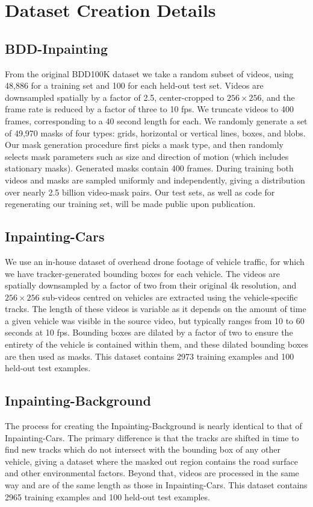 \chapter{Dataset Creation Details}
\label{app:datasetss}
\section{BDD-Inpainting}

From the original BDD100K dataset we take a random subset of videos, using 48,886 for a training set and 100 for each held-out test set. Videos are downsampled spatially by a factor of 2.5, center-cropped to $256 \times 256$, and the frame rate is reduced by a factor of three to 10 fps.  We truncate videos to 400 frames, corresponding to a 40 second length for each. We randomly generate a set of 49,970 masks of four types: grids, horizontal or vertical lines, boxes, and blobs. Our mask generation procedure first picks a mask type, and then randomly selects mask parameters such as size and direction of motion (which includes stationary masks). Generated masks contain 400 frames. During training both videos and masks are sampled uniformly and independently, giving a distribution over nearly 2.5 billion video-mask pairs. Our test sets, as well as code for regenerating our training set, will be made public upon publication.

\section{Inpainting-Cars}
 We use an in-house dataset of overhead drone footage of vehicle traffic, for which we have tracker-generated bounding boxes for each vehicle. The videos are spatially downsampled by a factor of two from their original 4k resolution, and  $256 \times 256$ sub-videos centred on vehicles are extracted using the vehicle-specific tracks. The length of these videos is variable as it depends on the amount of time a given vehicle was visible in the source video, but typically ranges from 10 to 60 seconds at 10 fps. Bounding boxes are dilated by a factor of two to ensure the entirety of the vehicle is contained within them, and these dilated bounding boxes are then used as masks. This dataset contains 2973 training examples and 100 held-out test examples. 

\section{Inpainting-Background}
 The process for creating the Inpainting-Background is nearly identical to that of Inpainting-Cars. The primary difference is that the tracks are shifted in time to find new tracks which do not intersect with the bounding box of any other vehicle, giving a dataset where the masked out region contains the road surface and other environmental factors. Beyond that, videos are processed in the same way and are of the same length as those in Inpainting-Cars. This dataset contains 2965 training examples and 100 held-out test examples.  

